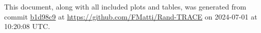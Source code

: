 This document, along with all included plots and tables, was generated from commit \href{https://github.com/FMatti/Rand-TRACE/tree/b1d98c9}{b1d98c9} at \url{https://github.com/FMatti/Rand-TRACE} on 2024-07-01 at 10:20:08 UTC.
